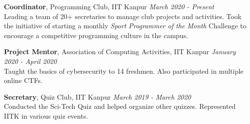 
\begin{cvitems}
\vspace{3mm}
\item \textbf{Coordinator}, {Programming Club, IIT Kanpur \hfill \bodyfont\color{awesome}\emph{March 2020 - Present}} \\
  Leading a team of 20+ secretaries to manage club projects and activities. Took the initiative of starting a monthly \textit{Sport Programmer of the Month} Challenge to encourage a competitive programming culture in the campus.
\vspace{2mm}
\item \textbf{Project Mentor}, {Association of Computing Activities, IIT Kanpur \hfill \bodyfont\color{awesome}\emph{January 2020 - April 2020}}\\
  Taught the basics of cybersecurity to 14 freshmen. Also participated in multiple online CTFs.
\vspace{2mm}
\item \textbf{Secretary}, {Quiz Club, IIT Kanpur \hfill \bodyfont\color{awesome}\emph{March 2019 - March 2020}}\\
  Conducted the Sci-Tech Quiz and helped organize other quizzes. Represented IITK in various quiz events.
\end{cvitems}
\vspace{5mm}
